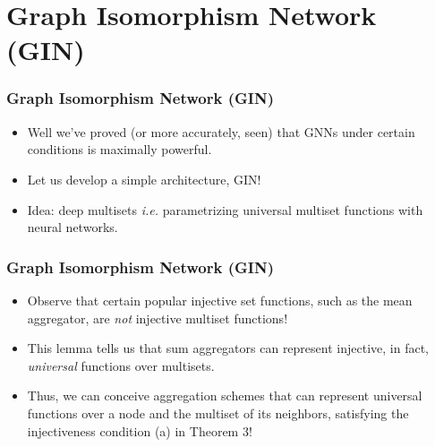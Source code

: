 \documentclass{beamer}
\begin{document}

\section{Graph Isomorphism Network (GIN)}

\begin{frame}
\frametitle{Graph Isomorphism Network (GIN)}

\begin{itemize}
	\item Well we've proved (or more accurately, seen) that GNNs under certain conditions is maximally powerful. \pause
	
	\item Let us develop a simple architecture, GIN! \pause
	
	\item Idea: \alert{deep multisets} {\it i.e.} parametrizing universal multiset functions with neural networks. \pause

\end{itemize}


\end{frame}

\begin{frame}
\frametitle{Graph Isomorphism Network (GIN)}

\begin{itemize}
\begin{block}{Lemma 5}
Assume $\mathcal{X}$ is countable.
There exists a function $f : \mathcal{X} \rightarrow \mathbb{R}^n$ so that $h(X) = \sum_{x \in X} f(x)$ is unique for each multiset $X \subset \mathcal{X}$ of bounded size.

Moreover, any multiset function $g$ can be decomposed as $g(X) = \phi \left( \sum_{x \in X} f(x) \right)$ for some function $\phi$.
\end{block} \pause

	\item Observe that certain popular injective set functions, such as the mean aggregator, are {\it not} injective multiset functions! \pause
	
	\item This lemma tells us that sum aggregators can represent injective, in fact, {\it universal} functions over multisets. \pause
	
	\item Thus, we can conceive aggregation schemes that can represent universal functions over a node and the multiset of its neighbors, satisfying the injectiveness condition (a) in Theorem 3!

\end{itemize}


\end{frame}
\end{document}
